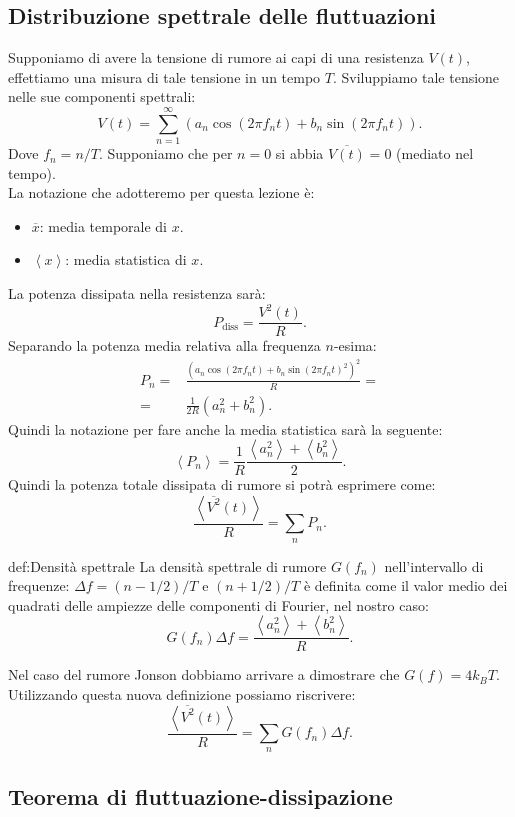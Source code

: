 \subsection{Distribuzione spettrale delle fluttuazioni}
\label{subsec:Distribuzione spettrale delle fluttuazioni}
Supponiamo di avere la tensione di rumore ai capi di una resistenza $V(t)$, effettiamo una misura di tale tensione in un tempo $T$. Sviluppiamo tale tensione nelle sue componenti spettrali:
\[
	V( t) 
	=
	\sum_{n=1}^{\infty} 
	\left( a_n \cos( 2\pi f_n t) + b_n \sin( 2\pi f_n t)  \right) 
.\] 
Dove $f_n = n /T$.
Supponiamo che per $n=0$ si abbia $\overline{V(t)}=0$ (mediato nel tempo).\\
La notazione che adotteremo per questa lezione è:
\begin{itemize}
	\item $\overline{x}$: media temporale di $x$.
	\item $\left<x \right>$: media statistica di $x$.
\end{itemize}
La potenza dissipata nella resistenza sarà:
\[
	P_\text{diss} 
	=
	\frac{V^2( t) }{R}
.\] 
Separando la potenza media relativa alla frequenza $n$-esima:
\[\begin{aligned}
	P_n 
	=&
	\frac{\left( a_n \cos( 2\pi f_n t) + b_n\sin( 2\pi f_n t)^2  \right)^2}{R}=\\
	=&
	\frac{1}{2R}\left( a_n^2+b_n^2 \right) 
.\end{aligned}\]
Quindi la notazione per fare anche la media statistica sarà la seguente:
\[
	\left<P_n \right> 
	=
	\frac{1}{R}
	\frac{\left<a_n^2 \right>+ \left<b_n ^2\right>}{2}
.\] 
Quindi la potenza totale dissipata di rumore si potrà esprimere come:
\[
	\frac{\left<\overline{V^2}(t)\right>}{R} 
	=
	\sum_{n}^{} P_n
.\] 
\begin{defn}{def:Densità spettrale}
	La densità spettrale di rumore $G(f_n)$ nell'intervallo di frequenze: 
	$\Delta f=(n-1/2)/T$ e $(n+1/2)/T$
	è definita come il valor medio dei quadrati delle ampiezze delle componenti 
	di Fourier, nel nostro caso:
	 \[
		 G(f_n) \Delta f 
		 =
		 \frac{\left<a_n^2 \right>+\left<b_n^2 \right>}{R}
	.\] 
\end{defn}
Nel caso del rumore Jonson dobbiamo arrivare a dimostrare che $G( f) = 4k_B T$.\\
Utilizzando questa nuova definizione possiamo riscrivere:
\[
	\frac{\left<\overline{V^2}(t)\right>}{R} 
	=
	\sum_{n}^{} G( f_n) \Delta f
.\] 
\subsection{Teorema di fluttuazione-dissipazione}
\label{subsec:Teorema di fluttuazione-dissipazione}


